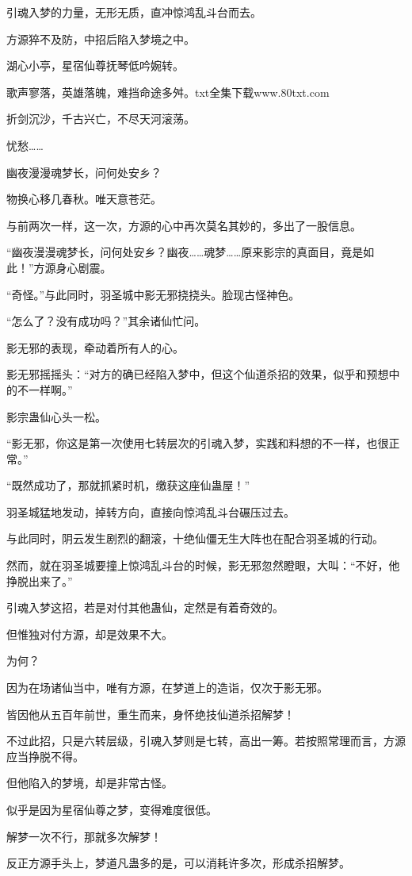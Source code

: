 \begin{this_body}
引魂入梦的力量，无形无质，直冲惊鸿乱斗台而去。

方源猝不及防，中招后陷入梦境之中。

湖心小亭，星宿仙尊抚琴低吟婉转。

歌声寥落，英雄落魄，难挡命途多舛。txt全集下载www.80txt.com

折剑沉沙，千古兴亡，不尽天河滚荡。

忧愁……

幽夜漫漫魂梦长，问何处安乡？

物换心移几春秋。唯天意苍茫。

与前两次一样，这一次，方源的心中再次莫名其妙的，多出了一股信息。

“幽夜漫漫魂梦长，问何处安乡？幽夜……魂梦……原来影宗的真面目，竟是如此！”方源身心剧震。

“奇怪。”与此同时，羽圣城中影无邪挠挠头。脸现古怪神色。

“怎么了？没有成功吗？”其余诸仙忙问。

影无邪的表现，牵动着所有人的心。

影无邪摇摇头：“对方的确已经陷入梦中，但这个仙道杀招的效果，似乎和预想中的不一样啊。”

影宗蛊仙心头一松。

“影无邪，你这是第一次使用七转层次的引魂入梦，实践和料想的不一样，也很正常。”

“既然成功了，那就抓紧时机，缴获这座仙蛊屋！”

羽圣城猛地发动，掉转方向，直接向惊鸿乱斗台碾压过去。

与此同时，阴云发生剧烈的翻滚，十绝仙僵无生大阵也在配合羽圣城的行动。

然而，就在羽圣城要撞上惊鸿乱斗台的时候，影无邪忽然瞪眼，大叫：“不好，他挣脱出来了。”

引魂入梦这招，若是对付其他蛊仙，定然是有着奇效的。

但惟独对付方源，却是效果不大。

为何？

因为在场诸仙当中，唯有方源，在梦道上的造诣，仅次于影无邪。

皆因他从五百年前世，重生而来，身怀绝技仙道杀招解梦！

不过此招，只是六转层级，引魂入梦则是七转，高出一筹。若按照常理而言，方源应当挣脱不得。

但他陷入的梦境，却是非常古怪。

似乎是因为星宿仙尊之梦，变得难度很低。

解梦一次不行，那就多次解梦！

反正方源手头上，梦道凡蛊多的是，可以消耗许多次，形成杀招解梦。


\end{this_body}
